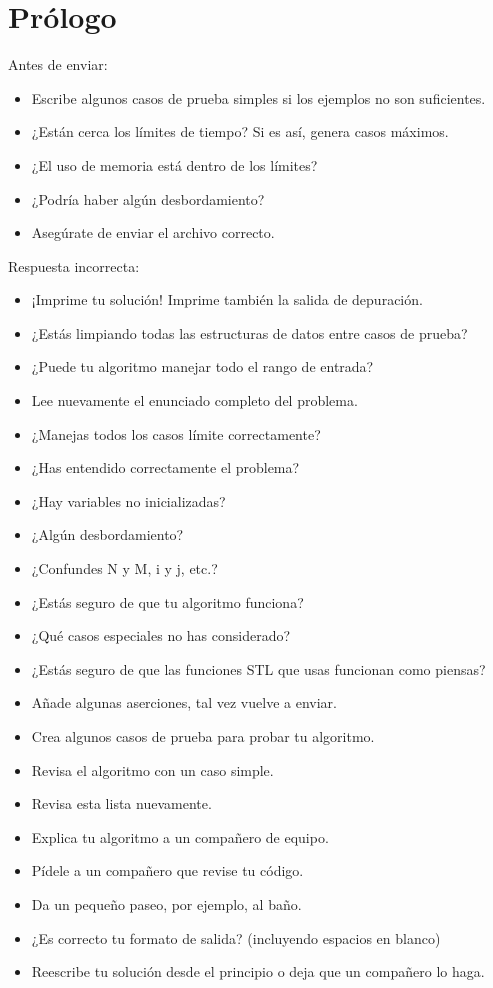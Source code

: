 \chapter{Prólogo}

Antes de enviar:
\begin{itemize}
	\item Escribe algunos casos de prueba simples si los ejemplos no son suficientes.
	\item ¿Están cerca los límites de tiempo? Si es así, genera casos máximos.
	\item ¿El uso de memoria está dentro de los límites?
	\item ¿Podría haber algún desbordamiento?
	\item Asegúrate de enviar el archivo correcto.
\end{itemize}

Respuesta incorrecta:
\begin{itemize}
	\item ¡Imprime tu solución! Imprime también la salida de depuración.
	\item ¿Estás limpiando todas las estructuras de datos entre casos de prueba?
	\item ¿Puede tu algoritmo manejar todo el rango de entrada?
	\item Lee nuevamente el enunciado completo del problema.
	\item ¿Manejas todos los casos límite correctamente?
	\item ¿Has entendido correctamente el problema?
	\item ¿Hay variables no inicializadas?
	\item ¿Algún desbordamiento?
	\item ¿Confundes N y M, i y j, etc.?
	\item ¿Estás seguro de que tu algoritmo funciona?
	\item ¿Qué casos especiales no has considerado?
	\item ¿Estás seguro de que las funciones STL que usas funcionan como piensas?
	\item Añade algunas aserciones, tal vez vuelve a enviar.
	\item Crea algunos casos de prueba para probar tu algoritmo.
	\item Revisa el algoritmo con un caso simple.
	\item Revisa esta lista nuevamente.
	\item Explica tu algoritmo a un compañero de equipo.
	\item Pídele a un compañero que revise tu código.
	\item Da un pequeño paseo, por ejemplo, al baño.
	\item ¿Es correcto tu formato de salida? (incluyendo espacios en blanco)
	\item Reescribe tu solución desde el principio o deja que un compañero lo haga.
\end{itemize}

